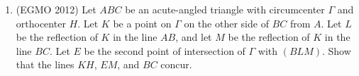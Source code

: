 \documentclass[11pt,paper=letter]{scrartcl}
\begin{document}
\begin{enumerate}
  \item (EGMO 2012) Let $ABC$ be an acute-angled triangle with circumcenter $\Gamma$ and orthocenter $H$. Let $K$ be a point on $\Gamma$ on the other side of $BC$ from $A$. Let $L$ be the reflection of $K$ in the line $AB$, and let $M$ be the reflection of $K$ in the line $BC$. Let $E$ be the second point of intersection of $\Gamma$ with $(BLM)$. Show that the lines $KH$, $EM$, and $BC$ concur.
\end{enumerate}
\end{document}
